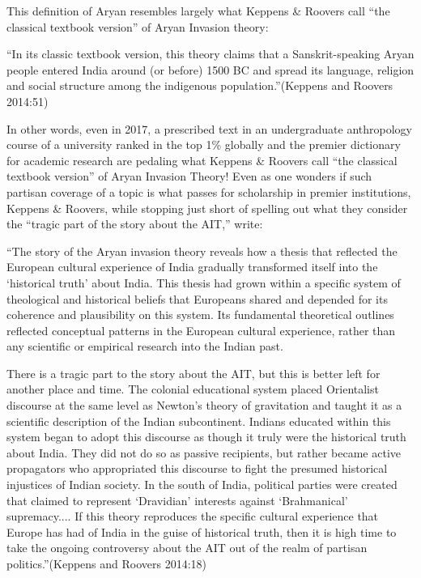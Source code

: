 This definition of Aryan resembles largely what Keppens \& Roovers call “the classical textbook version” of Aryan Invasion theory:

\begin{myquote}
“In its classic textbook version, this theory claims that a Sanskrit-speaking Aryan people entered India around (or before) 1500 BC and spread its language, religion and social structure among the indigenous population.”\hfill (Keppens and Roovers 2014:51)
\end{myquote}

In other words, even in 2017, a prescribed text in an undergraduate anthropology course of a university ranked in the top 1\% globally and the premier dictionary for academic research are pedaling what Keppens \& Roovers call “the classical textbook version” of Aryan Invasion Theory! Even as one wonders if such partisan coverage of a topic is what passes for scholarship in premier institutions, Keppens \& Roovers, while stopping just short of spelling out what they consider the “tragic part of the story about the AIT,” write:

\begin{myquote}
“The story of the Aryan invasion theory reveals how a thesis that reflected the European cultural experience of India gradually transformed itself into the ‘historical truth’ about India. This thesis had grown within a specific system of theological and historical beliefs that Europeans shared and depended for its coherence and plausibility on this system. Its fundamental theoretical outlines reflected conceptual patterns in the European cultural experience, rather than any scientific or empirical research into the Indian past.
\end{myquote}

\begin{myquote}
There is a tragic part to the story about the AIT, but this is better left for another place and time. The colonial educational system placed Orientalist discourse at the same level as Newton’s theory of gravitation and taught it as a scientific description of the Indian subcontinent. Indians educated within this system began to adopt this discourse as though it truly were the historical truth about India. They did not do so as passive recipients, but rather became active propagators who appropriated this discourse to fight the presumed historical injustices of Indian society. In the south of India, political parties were created that claimed to represent ‘Dravidian’ interests against ‘Brahmanical’ supremacy.... If this theory reproduces the specific cultural experience that Europe has had of India in the guise of historical truth, then it is high time to take the ongoing controversy about the AIT out of the realm of partisan politics.”\hfill (Keppens and Roovers 2014:18)
\end{myquote}

